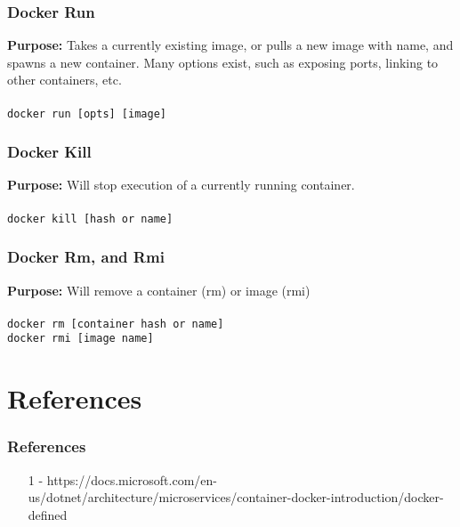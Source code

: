 \documentclass{beamer}
\begin{document}
\begin{frame}\frametitle{Docker Run}
  \textbf{Purpose:} Takes a currently existing image, or pulls a new image with name, and spawns a new container.  Many options exist, such as exposing ports, linking to other containers, etc.
  \\ \\
  \texttt{docker run [opts] [image]}
\end{frame}

\begin{frame}\frametitle{Docker Kill}
  \textbf{Purpose:} Will stop execution of a currently running container.
  \\ \\
  \texttt{docker kill [hash or name]}  
\end{frame}

\begin{frame}\frametitle{Docker Rm, and Rmi}
  \textbf{Purpose:} Will remove a container (rm) or image (rmi)
  \\ \\
  \texttt{docker rm [container hash or name]}  \\
  \texttt{docker rmi [image name]}  \\  
\end{frame}

\section{References}
\begin{frame}\frametitle{References}
  \begin{itemize}
    \item [1] - https://docs.microsoft.com/en-us/dotnet/architecture/microservices/container-docker-introduction/docker-defined
  \end{itemize}
\end{frame}
\end{document}
